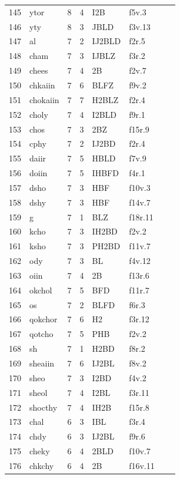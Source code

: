 \documentclass[11pt,a4paper]{article}
\begin{document}
\begin{landscape}
\begin{longtable}{@{}r>{\ttfamily}lrrl>{\ttfamily}l>{\raggedright\arraybackslash}p{80mm}>{\raggedright\arraybackslash}p{36mm}@{}}
145 & ytor & 8 & 4 & I2B & f5v.3 &  & \\
146 & yty & 8 & 3 & JBLD & f3v.13 &  & \\
147 & al & 7 & 2 & IJ2BLD & f2r.5 &  & \\
148 & cham & 7 & 3 & IJBLZ & f3r.2 &  & \\
149 & chees & 7 & 4 & 2B & f2v.7 &  & \\
150 & chkaiin & 7 & 6 & BLFZ & f9v.2 &  & \\
151 & chokaiin & 7 & 7 & H2BLZ & f2r.4 &  & \\
152 & choly & 7 & 4 & I2BLD & f9r.1 &  & \\
153 & chos & 7 & 3 & 2BZ & f15r.9 &  & \\
154 & cphy & 7 & 2 & IJ2BD & f2r.4 &  & \\
155 & daiir & 7 & 5 & HBLD & f7v.9 &  & \\
156 & doiin & 7 & 5 & IHBFD & f4r.1 &  & \\
157 & dsho & 7 & 3 & HBF & f10v.3 &  & \\
158 & dshy & 7 & 3 & HBF & f14v.7 &  & \\
159 & g & 7 & 1 & BLZ & f18r.11 &  & \\
160 & kcho & 7 & 3 & IH2BD & f2v.2 &  & \\
161 & ksho & 7 & 3 & PH2BD & f11v.7 &  & \\
162 & ody & 7 & 3 & BL & f4v.12 &  & \\
163 & oiin & 7 & 4 & 2B & f13r.6 &  & \\
164 & okchol & 7 & 5 & BFD & f11r.7 &  & \\
165 & os & 7 & 2 & BLFD & f6r.3 &  & \\
166 & qokchor & 7 & 6 & H2 & f3r.12 &  & \\
167 & qotcho & 7 & 5 & PHB & f2v.2 &  & \\
168 & sh & 7 & 1 & H2BD & f8r.2 &  & \\
169 & sheaiin & 7 & 6 & IJ2BL & f8v.2 &  & \\
170 & sheo & 7 & 3 & I2BD & f4v.2 &  & \\
171 & sheol & 7 & 4 & I2BL & f3r.11 &  & \\
172 & shocthy & 7 & 4 & IH2B & f15r.8 &  & \\
173 & chal & 6 & 3 & IBL & f3r.4 &  & \\
174 & chdy & 6 & 3 & IJ2BL & f9r.6 &  & \\
175 & cheky & 6 & 4 & 2BLD & f10v.7 &  & \\
176 & chkchy & 6 & 4 & 2B & f16v.11 &  & \\

\end{longtable}
\end{landscape}
\end{document}
